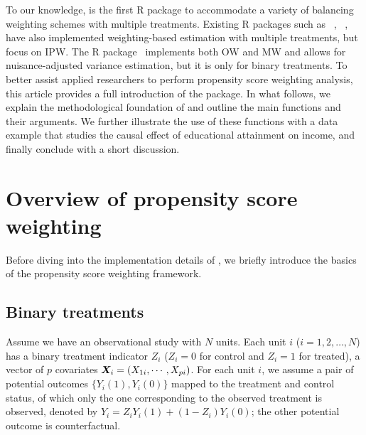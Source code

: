 To our knowledge,  is the first R package to accommodate a variety of balancing weighting schemes with multiple treatments. Existing R packages such as ~\citep{twang}, ~\citep{CBPS}, ~\citep{optweight} have also implemented weighting-based estimation with multiple treatments, but focus on IPW. The  R package~\citep{PSW}  implements both OW and MW and allows for nuisance-adjusted variance estimation, but it is only for binary treatments. To better assist applied researchers to perform propensity score weighting analysis, this article provides a full introduction of the  package. %
In what follows, we explain the methodological foundation of  and outline the main functions and their arguments. We further illustrate the use of these functions with a data example that studies the causal effect of educational attainment on income, and finally 
conclude with a short discussion.%



\section{Overview of propensity score weighting} \label{sec:models}

Before diving into the implementation details of , we briefly introduce the basics of the propensity score weighting framework. 

\subsection{Binary treatments}\label{sec:binary}

 
Assume we have an observational study with $N$ units. Each unit $i$ ($i=1,2,\ldots,N$) has a binary treatment indicator $Z_{i}$ ($Z_{i}=0$ for control and $Z_{i}=1$ for treated), a vector of $p$ covariates $\bm{X}_{i}=(X_{1i},\cdots, X_{pi})$. For each unit $i$, we assume a pair of potential outcomes $\{Y_{i}(1),Y_{i}(0)\}$ mapped to the treatment and control status, of which only the one corresponding to the observed treatment is observed, denoted by $Y_i=Z_{i}Y_{i}(1)+(1-Z_{i})Y_{i}(0)$; the other potential outcome is counterfactual.

